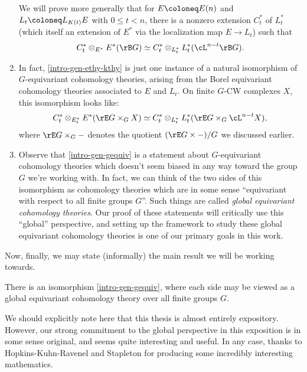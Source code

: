 \begin{nothing}
\begin{enumerate}[leftmargin=*]
    We will prove more generally that for $E \ce E(n)$ and
    $L_t \ce L_{K(t)}E$ with $0 \le t < n$, there is a nonzero
    extension $C_t^*$ of $L_t^*$ (which itself an extension of $E^*$
    via the localization map $E \to L_t$) such that
    \begin{equation}
      \label{intro-gen-ethy-kthy}
      C_t^* \otimes_{E^*} E^*(\rB G) \iso
      C_t^* \otimes_{L_t^*}
      L_t^*(\cL^{n-t}\rB G).
    \end{equation}

  \item In fact, \cref{intro-gen-ethy-kthy} is just one instance of a
    natural isomorphism of $G$-equivariant cohomology theories,
    arising from the Borel equivariant cohomology theories associated
    to $E$ and $L_t$. On finite $G$-CW complexes $X$, this isomorphism
    looks like:
    \begin{equation}
      \label{intro-gen-gequiv}
      C_t^* \otimes_{E_t^*} E^*(\rE G \times_G X) \iso
      C_t^* \otimes_{L_t^*}
      L_t^*(\rE G \times_G \cL^{n-t}X),
    \end{equation}
    where $\rE G \times_G -$ denotes the quotient $(\rE G \times -)/G$
    we discussed earlier.

  \item Observe that \cref{intro-gen-gequiv} is a statement about
    $G$-equivariant cohomology theories which doesn't seem biased in
    any way toward the group $G$ we're working with. In fact, we can
    think of the two sides of this isomorphism as cohomology theories
    which are in some sense ``equivariant with respect to all finite
    groups $G$''. Such things are called \emph{global equivariant
      cohomology theories}. Our proof of these statements will
    critically use this ``global'' perspective, and setting up the
    framework to study these global equivariant cohomology theories is
    one of our primary goals in this work.
  \end{enumerate}
\end{nothing}

Now, finally, we may state (informally) the main result we will be
working towards.

\begin{theorem}[Informal]
  \label{intro-main-informal}
  There is an isomorphism \cref{intro-gen-gequiv}, where each side may
  be viewed as a global equivariant cohomology theory over all finite
  groups $G$.
\end{theorem}

\begin{remark}
  \label{intro-credit}
  We should explicitly note here that this thesis is almost entirely
  expository. However, our strong commitment to the global perspective
  in this exposition is in some sense original, and seems quite
  interesting and useful. In any case, thanks to Hopkins-Kuhn-Ravenel
  and Stapleton for producing some incredibly interesting mathematics.
\end{remark}

